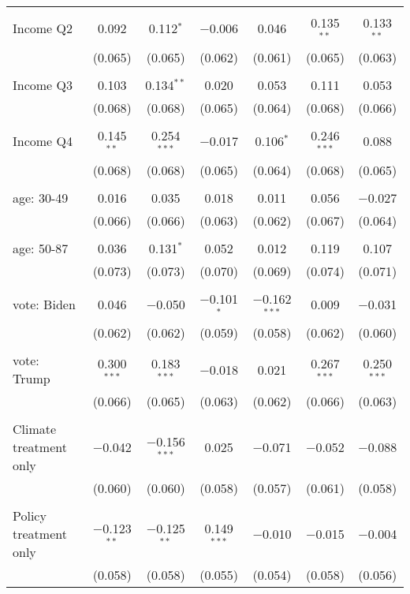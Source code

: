\begin{tabular}{@{\extracolsep{5pt}}lcccccc}
  & & & & & & \\ 
 Income Q2 & 0.092 & 0.112$^{*}$ & $-$0.006 & 0.046 & 0.135$^{**}$ & 0.133$^{**}$ \\ 
  & (0.065) & (0.065) & (0.062) & (0.061) & (0.065) & (0.063) \\ 
  & & & & & & \\ 
 Income Q3 & 0.103 & 0.134$^{**}$ & 0.020 & 0.053 & 0.111 & 0.053 \\ 
  & (0.068) & (0.068) & (0.065) & (0.064) & (0.068) & (0.066) \\ 
  & & & & & & \\ 
 Income Q4 & 0.145$^{**}$ & 0.254$^{***}$ & $-$0.017 & 0.106$^{*}$ & 0.246$^{***}$ & 0.088 \\ 
  & (0.068) & (0.068) & (0.065) & (0.064) & (0.068) & (0.065) \\ 
  & & & & & & \\ 
 age: 30-49 & 0.016 & 0.035 & 0.018 & 0.011 & 0.056 & $-$0.027 \\ 
  & (0.066) & (0.066) & (0.063) & (0.062) & (0.067) & (0.064) \\ 
  & & & & & & \\ 
 age: 50-87 & 0.036 & 0.131$^{*}$ & 0.052 & 0.012 & 0.119 & 0.107 \\ 
  & (0.073) & (0.073) & (0.070) & (0.069) & (0.074) & (0.071) \\ 
  & & & & & & \\ 
 vote: Biden & 0.046 & $-$0.050 & $-$0.101$^{*}$ & $-$0.162$^{***}$ & 0.009 & $-$0.031 \\ 
  & (0.062) & (0.062) & (0.059) & (0.058) & (0.062) & (0.060) \\ 
  & & & & & & \\ 
 vote: Trump & 0.300$^{***}$ & 0.183$^{***}$ & $-$0.018 & 0.021 & 0.267$^{***}$ & 0.250$^{***}$ \\ 
  & (0.066) & (0.065) & (0.063) & (0.062) & (0.066) & (0.063) \\ 
  & & & & & & \\ 
 Climate treatment only & $-$0.042 & $-$0.156$^{***}$ & 0.025 & $-$0.071 & $-$0.052 & $-$0.088 \\ 
  & (0.060) & (0.060) & (0.058) & (0.057) & (0.061) & (0.058) \\ 
  & & & & & & \\ 
 Policy treatment only & $-$0.123$^{**}$ & $-$0.125$^{**}$ & 0.149$^{***}$ & $-$0.010 & $-$0.015 & $-$0.004 \\ 
  & (0.058) & (0.058) & (0.055) & (0.054) & (0.058) & (0.056) \\ 

\end{tabular}

